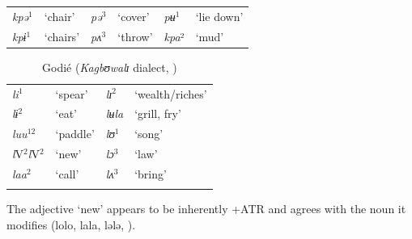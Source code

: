 \documentclass[output=paper,newtxmath,modfonts,nonflat,draft]{langsci/langscibook}
\begin{document}
\ea {}  \citep{Werle1976}

\begin{tabular}{llllll}
\textit{kpə}$^1$ & ‘chair’  &  \textit{pə}$^3$ &  ‘cover’  &  \textit{pʉ}$^1$& ‘lie down’\\

\textit{kpɨ}$^1$ &  ‘chairs’ & \textit{pʌ}$^3$   & ‘throw’ & \textit{kpa}²  &  ‘mud’ \\
\end{tabular}
\z

\begin{table}
\begin{tabularx}{\textwidth}{XXXl}
\lsptoprule	
\textit{li}$^1$  &  ‘spear’  &  \textit{lɪ}$^2$ & ‘wealth/riches’\\

\textit{lɨ}$^2$  &  ‘eat’  &  \textit{lʉla}  &  ‘grill, fry’\\

\textit{luu}$^{12}$ &   ‘paddle’ & \textit{lʊ}$^1$ & ‘song’\\

\textit{l}V$^2$\textit{l}V$^2$ & ‘new’    & \textit{lɔ}$^3$  &  ‘law’ \\

\textit{laa}$^2$ & ‘call’ &   \textit{lʌ}$^3$ &    ‘bring’ \\
\lspbottomrule
\end{tabularx}
\caption{Godié (\textit{Kagbʊwalɪ} dialect, \citealt{Association2004})}
\label{tab:zogbo:6}
\end{table}


The adjective ‘new’ appears to be inherently +ATR and agrees with the noun it modifies (lolo, lala, lələ, ).
\end{document}
